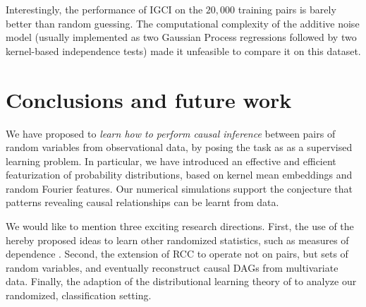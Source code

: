 \documentclass[twoside,11pt,a4paper]{article}
\begin{document}
Interestingly, the performance of IGCI on the $20,000$ training pairs is barely
better than random guessing. The computational complexity of the additive noise
model (usually implemented as two Gaussian Process regressions followed by two
kernel-based independence tests) made it unfeasible to compare it on this
dataset. 

\section{Conclusions and future work}\label{sec:future}
We have proposed to \emph{learn how to perform causal inference} between pairs
of random variables from observational data, by posing the task as as a
supervised learning problem. In particular, we have introduced an effective and
efficient featurization of probability distributions, based on kernel mean
embeddings and random Fourier features. Our numerical simulations support the
conjecture that patterns revealing causal relationships can be learnt from
data.

We would like to mention three exciting research directions.  First, the use of
the hereby proposed ideas to learn other randomized statistics, such as
measures of dependence \citep{Lopez-Paz13}. Second, the extension of RCC to
operate not on pairs, but sets of random variables, and eventually reconstruct
causal DAGs from multivariate data. Finally, the adaption of the distributional
learning theory of \citet{Szabo14} to analyze our randomized,
classification setting.

\small

\end{document}
